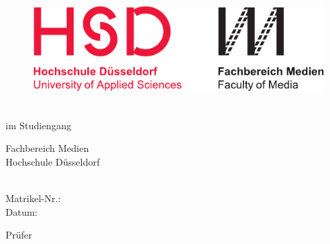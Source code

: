 \thispagestyle{empty}

\begin{figure}
  \flushleft %
  \includegraphics[width=.5\textwidth]{figures/hsd_m_logo.pdf}
\end{figure}

\vspace*{12ex}

\hfill
\begin{minipage}{.8\textwidth}
  \begin{flushright}
    
    {\Huge\bfseries\DocumentThesisTitle\par}
    
    \vspace*{2ex}		
    
    {\large\DocumentThesisSubtitle}
    
    \vspace*{12ex}
    
    \onehalfspacing
    
    \textbf{\DocumentThesisType}\\
    \vspace*{1ex}
    im Studiengang \DocumentThesisCourse\\
    
    \vspace*{8ex}
    
    Fachbereich Medien\\
    Hochschule Düsseldorf
    
    \vspace*{12ex}
    
    \DocumentAuthorPrename\ \DocumentAuthorName\\
    Matrikel-Nr.: \DocumentThesisMatr\\
    Datum: \DocumentThesisDateCover
    
    \vspace*{12ex}
    
    Prüfer\\
    \vspace*{1ex}
    \DocumentThesisFirstExaminer
    
  \end{flushright}
\end{minipage}